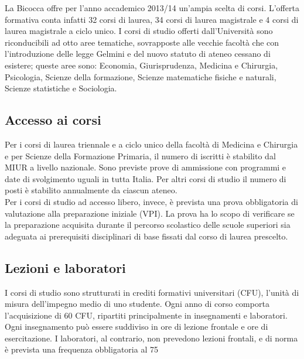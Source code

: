 La Bicocca offre per l'anno accademico 2013/14 un'ampia scelta di corsi. L'offerta formativa conta infatti 32 corsi di laurea, 34 corsi di laurea magistrale e 4 corsi di laurea magistrale a ciclo unico. I corsi di studio offerti dall'Università sono riconducibili ad otto aree tematiche, sovrapposte alle vecchie facoltà che  con l'introduzione delle legge Gelmini e del nuovo statuto di ateneo cessano di esistere; queste aree sono: Economia, Giurisprudenza, Medicina e Chirurgia, Psicologia, Scienze della formazione, Scienze matematiche fisiche e naturali, Scienze statistiche e Sociologia. 

\subsection{Accesso ai corsi}
Per i corsi di laurea triennale e a ciclo unico della facoltà di Medicina e Chirurgia e per Scienze della Formazione Primaria, il numero di iscritti è stabilito dal MIUR a livello nazionale. Sono previste prove di ammissione con programmi e date di svolgimento uguali in tutta Italia. Per altri corsi di studio il numero di posti è stabilito annualmente da ciascun ateneo.\\
Per i corsi di studio ad accesso libero, invece, è prevista una prova obbligatoria di valutazione alla preparazione iniziale (VPI). La prova ha lo scopo di verificare se la preparazione acquisita durante il percorso scolastico delle scuole superiori sia adeguata ai prerequisiti disciplinari di base fissati dal corso di laurea prescelto. 

\subsection{Lezioni e laboratori}
I corsi di studio sono strutturati in crediti formativi universitari (CFU), l'unità di misura dell'impegno medio di uno studente. Ogni anno di corso comporta l'acquisizione di 60 CFU, ripartiti principalmente in insegnamenti e laboratori. Ogni insegnamento può essere suddiviso in ore di lezione frontale e ore di esercitazione. I laboratori, al contrario, non prevedono lezioni frontali, e di norma è prevista una frequenza obbligatoria al 75%

